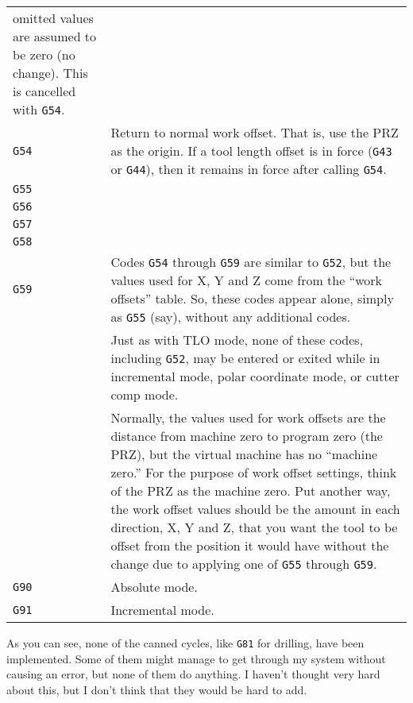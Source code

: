 \documentclass[titlepage,oneside,10pt]{article}
\begin{document}
\begin{longtable}{lp{10cm}}
omitted values are assumed to be zero (no change). This is cancelled
with {\tt G54}. \\
{\tt G54}& Return to normal work offset. That is, use the PRZ as the
origin. If a tool length offset is in force ({\tt G43} or {\tt G44}),
then it remains in force after calling {\tt G54}.\\
{\tt G55}&\\
{\tt G56}&\\
{\tt G57}&\\
{\tt G58}&\\
{\tt G59}&Codes {\tt G54} through {\tt G59} are similar to {\tt G52},
but the values used for X, Y and Z come from the ``work offsets''
table. So, these codes appear alone, simply as {\tt G55} (say),
without any additional codes.\\
&Just as with TLO mode, none of these codes, including {\tt G52}, may be
entered or exited while in incremental mode, polar coordinate mode, or
cutter comp mode.\\
&Normally, the values used for work offsets are the distance from
machine zero to program zero (the PRZ), but the virtual machine has no
``machine zero.'' For the purpose of work offset settings, think of
the PRZ as the machine zero. Put another way, the work offset values
should be the amount in each direction, X, Y and Z, that you want the
tool to be offset from the position it would have without the change
due to applying one of {\tt G55} through {\tt G59}.\\
{\tt G90}&Absolute mode.\\
{\tt G91}&Incremental mode.
\end{longtable}
\vskip 0.50cm
As you can see, none of the canned cycles, like {\tt G81} for
drilling, have been implemented. Some of them might manage to get
through my system without causing an error, but none of them do
anything. I haven't thought very hard about this, but I don't think that
they would be hard to add.
\end{document}
